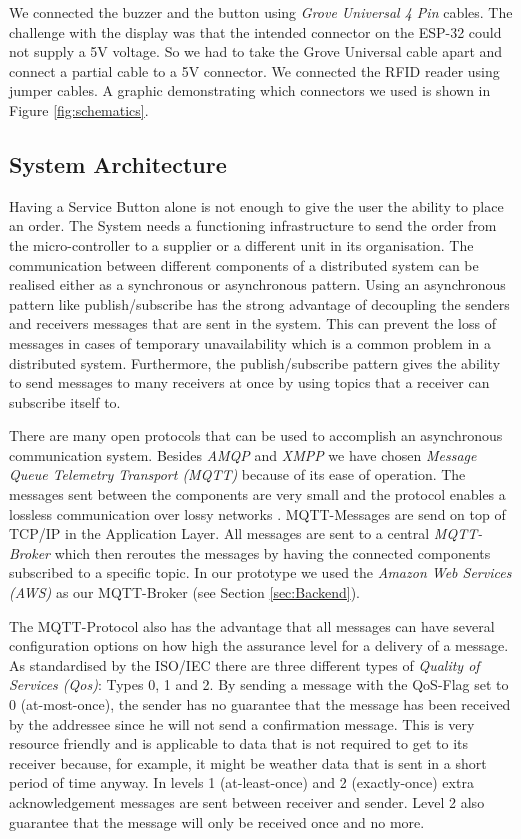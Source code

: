 We connected the buzzer and the button using \textit{Grove Universal 4 Pin} cables. The challenge with the display was that the intended connector on the ESP-32 could not supply a 5V voltage. So we had to take the Grove Universal cable apart and connect a partial cable to a 5V connector. We connected the RFID reader using jumper cables. A graphic demonstrating which connectors we used is shown in Figure \ref{fig:schematics}.


\subsection{System Architecture}
\label{sec:Technologies:Architecture}

Having a Service Button alone is not enough to give the user the ability to place an order. The System needs a functioning infrastructure to send the order from the micro-controller to a supplier or a different unit in its organisation. The communication between different components of a distributed system can be realised either as a synchronous or asynchronous pattern. Using an asynchronous pattern like publish/subscribe has the strong advantage of decoupling the senders and receivers messages that are sent in the system. This can prevent the loss of messages in cases of temporary unavailability which is a common problem in a distributed system. Furthermore, the publish/subscribe pattern gives the ability to send messages to many receivers at once by using topics that a receiver can subscribe itself to. \cite{Adryan:TechFound-Network:2017}

There are many open protocols that can be used to accomplish an asynchronous communication system. Besides \textit{AMQP} and \textit{XMPP} we have chosen \textit{Message Queue Telemetry Transport (MQTT)} \cite{ISO:20922:2016} because of its ease of operation. The messages sent between the components are very small and the protocol enables a lossless communication over lossy networks \cite{Adryan:TechFound-Network:2017}. MQTT-Messages are send on top of TCP/IP in the Application Layer. All messages are sent to a central \textit{MQTT-Broker} which then reroutes the messages by having the connected components subscribed to a specific topic. In our prototype we used the \textit{Amazon Web Services (AWS)} as our MQTT-Broker (see Section \ref{sec:Backend}).

The MQTT-Protocol also has the advantage that all messages can have several configuration options on how high the assurance level for a delivery of a message. As standardised by the ISO/IEC \cite{ISO:20922:2016} there are three different types of \textit{Quality of Services (Qos)}: Types 0, 1 and 2. By sending a message with the QoS-Flag set to 0 (at-most-once), the sender has no guarantee that the message has been received by the addressee since he will not send a confirmation message. This is very resource friendly and is applicable to data that is not required to get to its receiver because, for example, it might be weather data that is sent in a short period of time anyway. In levels 1 (at-least-once) and 2 (exactly-once) extra acknowledgement messages are sent between receiver and sender. Level 2 also guarantee that the message will only be received once and no more.

